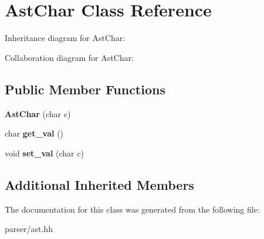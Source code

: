 \hypertarget{classAstChar}{}\section{Ast\+Char Class Reference}
\label{classAstChar}


Inheritance diagram for Ast\+Char\+:


Collaboration diagram for Ast\+Char\+:
\subsection*{Public Member Functions}
\begin{DoxyCompactItemize}
\item 
\mbox{\label{classAstChar_ae4e2774a54deb1bc21fe9c08728bd509}} 
{\bfseries Ast\+Char} (char c)
\item 
\mbox{\label{classAstChar_afb6f14e1673326d71c86984fe60d3cef}} 
char {\bfseries get\+\_\+val} ()
\item 
\mbox{\label{classAstChar_ad9cb2925331e0fb99a3c6c8836078835}} 
void {\bfseries set\+\_\+val} (char c)
\end{DoxyCompactItemize}
\subsection*{Additional Inherited Members}


The documentation for this class was generated from the following file\+:\begin{DoxyCompactItemize}
\item 
parser/ast.\+hh\end{DoxyCompactItemize}
